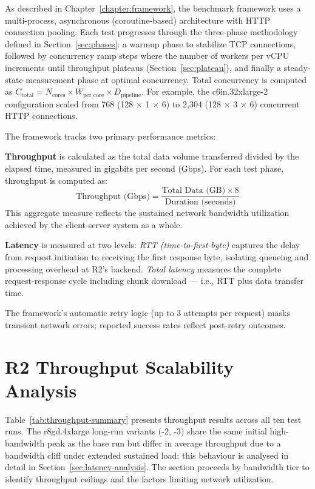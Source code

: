 As described in Chapter~\ref{chapter:framework}, the benchmark framework uses a multi-process, asynchronous (coroutine-based) architecture with HTTP connection pooling. Each test progresses through the three-phase methodology defined in Section~\ref{sec:phases}: a warmup phase to stabilize TCP connections, followed by concurrency ramp steps where the number of workers per vCPU increments until throughput plateaus (Section~\ref{sec:plateau}), and finally a steady-state measurement phase at optimal concurrency. Total concurrency is computed as $C_{\text{total}} = N_{\text{cores}} \times W_{\text{per\_core}} \times D_{\text{pipeline}}$. For example, the c6in.32xlarge-2 configuration scaled from 768 (128 $\times$ 1 $\times$ 6) to 2,304 (128 $\times$ 3 $\times$ 6) concurrent HTTP connections.

The framework tracks two primary performance metrics:

\textbf{Throughput} is calculated as the total data volume transferred divided by the elapsed time, measured in gigabits per second (Gbps). For each test phase, throughput is computed as:
\[
\text{Throughput (Gbps)} = \frac{\text{Total Data (GB)} \times 8}{\text{Duration (seconds)}}
\]
This aggregate measure reflects the sustained network bandwidth utilization achieved by the client-server system as a whole.

\textbf{Latency} is measured at two levels: \textit{RTT (time-to-first-byte)} captures the delay from request initiation to receiving the first response byte, isolating queueing and processing overhead at R2's backend. \textit{Total latency} measures the complete request-response cycle including chunk download --- i.e., RTT plus data transfer time.

The framework's automatic retry logic (up to 3 attempts per request) masks transient network errors; reported success rates reflect post-retry outcomes.

\section{R2 Throughput Scalability Analysis}\label{sec:throughput-analysis}

Table~\ref{tab:throughput-summary} presents throughput results across all ten test runs. The r8gd.4xlarge long-run variants (-2, -3) share the same initial high-bandwidth peak as the base run but differ in average throughput due to a bandwidth cliff under extended sustained load; this behaviour is analysed in detail in Section~\ref{sec:latency-analysis}. The section proceeds by bandwidth tier to identify throughput ceilings and the factors limiting network utilization.

